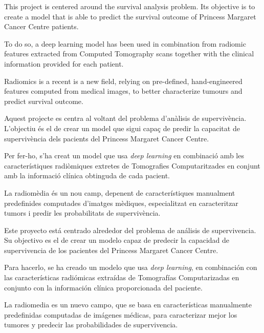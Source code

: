 

This project is centered around the survival analysis problem. Its objective
is to create a model that is able to predict the survival outcome of Princess 
Margaret Cancer Centre patients.

To do so, a deep learning model has been used in combination from radiomic features
extracted from Computed Tomography scans together with the clinical information
provided for each patient.

Radiomics is a recent is a new field, relying on pre-defined, 
hand-engineered features computed from medical images, to better characterize tumours 
and predict survival outcome.


Aquest projecte es centra al voltant del problema d'anàlisis de supervivència. L'objectiu
és el de crear un model que sigui capaç de predir la capacitat de supervivència dels 
pacients del Princess Margaret Cancer Centre.

Per fer-ho, s'ha creat un model que usa \emph{deep learning} en combinació amb les característiques
radiòmiques extretes de Tomografies Computaritzades en conjunt amb la informació clínica
obtinguda de cada pacient.

La radiomèdia és un nou camp, depenent de característiques manualment predefinides computades 
d'imatges mèdiques, especialitzat en caracteritzar tumors i predir les probabilitats de
supervivència.



Este proyecto está centrado alrededor del problema de análisis de supervivencia. Su objectivo
es el de crear un modelo capaz de predecir la capacidad de supervivencia de los pacientes
del Princess Margaret Cancer Centre.

Para hacerlo, se ha creado un modelo que usa \emph{deep learning}, en combinación con las 
características radiómicas extraídas de Tomografías Computarizadas en conjunto con la 
información clínica proporcionada del paciente.

La radiomedia es un nuevo campo, que se basa en características manualmente predefinidas 
computadas de imágenes médicas, para caracterizar mejor los tumores y predecir las probabilidades 
de supervivencia.
